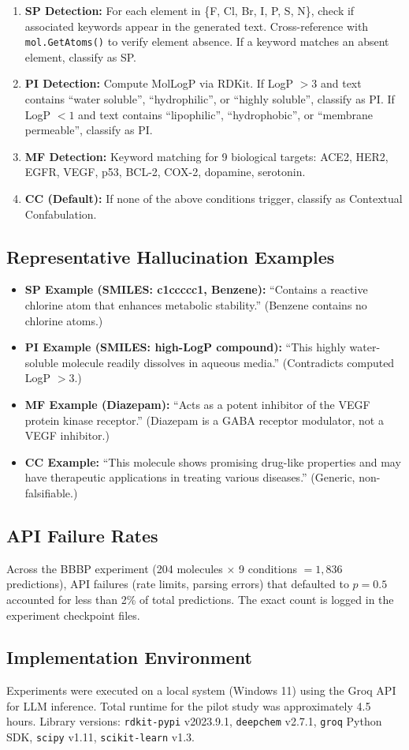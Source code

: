 \begin{enumerate}
    \item \textbf{SP Detection:} For each element in \{F, Cl, Br, I, P, S, N\}, check if associated keywords appear in the generated text. Cross-reference with \texttt{mol.GetAtoms()} to verify element absence. If a keyword matches an absent element, classify as SP.
    \item \textbf{PI Detection:} Compute MolLogP via RDKit. If LogP $> 3$ and text contains ``water soluble'', ``hydrophilic'', or ``highly soluble'', classify as PI. If LogP $< 1$ and text contains ``lipophilic'', ``hydrophobic'', or ``membrane permeable'', classify as PI.
    \item \textbf{MF Detection:} Keyword matching for 9 biological targets: ACE2, HER2, EGFR, VEGF, p53, BCL-2, COX-2, dopamine, serotonin.
    \item \textbf{CC (Default):} If none of the above conditions trigger, classify as Contextual Confabulation.
\end{enumerate}

\subsection{Representative Hallucination Examples}
\begin{itemize}
    \item \textbf{SP Example (SMILES: c1ccccc1, Benzene):} ``Contains a reactive chlorine atom that enhances metabolic stability.'' (Benzene contains no chlorine atoms.)
    \item \textbf{PI Example (SMILES: high-LogP compound):} ``This highly water-soluble molecule readily dissolves in aqueous media.'' (Contradicts computed LogP $> 3$.)
    \item \textbf{MF Example (Diazepam):} ``Acts as a potent inhibitor of the VEGF protein kinase receptor.'' (Diazepam is a GABA receptor modulator, not a VEGF inhibitor.)
    \item \textbf{CC Example:} ``This molecule shows promising drug-like properties and may have therapeutic applications in treating various diseases.'' (Generic, non-falsifiable.)
\end{itemize}

\subsection{API Failure Rates}
Across the BBBP experiment (204 molecules $\times$ 9 conditions $= 1{,}836$ predictions), API failures (rate limits, parsing errors) that defaulted to $p = 0.5$ accounted for less than 2\% of total predictions. The exact count is logged in the experiment checkpoint files.

\subsection{Implementation Environment}
Experiments were executed on a local system (Windows 11) using the Groq API for LLM inference. Total runtime for the pilot study was approximately 4.5 hours. Library versions: \texttt{rdkit-pypi} v2023.9.1, \texttt{deepchem} v2.7.1, \texttt{groq} Python SDK, \texttt{scipy} v1.11, \texttt{scikit-learn} v1.3.
